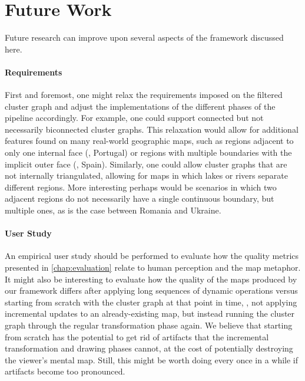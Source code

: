 \section{Future Work}
\label{sect:future-work}

Future research can improve upon several aspects of the framework discussed here.


\paragraph{Requirements}

First and foremost, one might relax the requirements imposed on the filtered cluster graph and adjust the implementations of the different phases of the pipeline accordingly.
For example, one could support connected but not necessarily biconnected cluster graphs.
This relaxation would allow for additional features found on many real-world geographic maps, such as regions adjacent to only one internal face (\eg{}, Portugal) or regions with multiple boundaries with the implicit outer face (\eg{}, Spain).
Similarly, one could allow cluster graphs that are not internally triangulated, allowing for maps in which lakes or rivers separate different regions.
More interesting perhaps would be scenarios in which two adjacent regions do not necessarily have a single continuous boundary, but multiple ones, as is the case between Romania and Ukraine.


\paragraph{User Study}

An empirical user study should be performed to evaluate how the quality metrics presented in \cref{chap:evaluation} relate to human perception and the map metaphor.
It might also be interesting to evaluate how the quality of the maps produced by our framework differs after applying long sequences of dynamic operations versus starting from scratch with the cluster graph at that point in time, \ie{}, not applying incremental updates to an already-existing map, but instead running the cluster graph through the regular transformation phase again.
We believe that starting from scratch has the potential to get rid of artifacts that the incremental transformation and drawing phases cannot, at the cost of potentially destroying the viewer's mental map.
Still, this might be worth doing every once in a while if artifacts become too pronounced.


